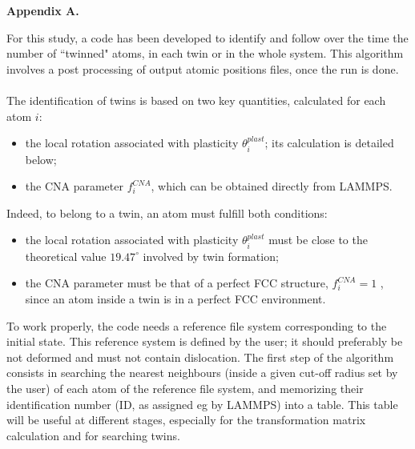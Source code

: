 \documentclass[final,3p,times,twocolumn]{elsarticle}
\begin{document}
\appendix
\noindent\textbf{Appendix A.}\newline
\label{part_appendix}

\renewcommand\thefigure{A.\arabic{figure}} 
\setcounter{figure}{0} 
\renewcommand\theequation{A.\arabic{equation}}
\setcounter{equation}{0}

For this study, a code has been developed to identify and follow over the time the number of ``twinned" atoms, in each twin or in the whole system. This algorithm involves a post processing of output atomic positions files, once the run is done. 
\\
\\
The identification of twins is based on two key quantities, calculated for each atom $i$:
\begin{itemize}
\item the local rotation associated with plasticity $\theta_{i}^{plast}$; its calculation is detailed below;
\item the CNA parameter $ f^{CNA}_{i} $, which can be obtained directly from LAMMPS.
\end{itemize}
Indeed, to belong to a twin, an atom must fulfill both conditions:
\begin{itemize}
\item the local rotation associated with plasticity $\theta_{i}^{plast}$ must be close to the theoretical value $19.47^{\circ}$ involved by twin formation;
\item the CNA parameter must be that of a perfect FCC structure, $f^{CNA}_{i} = 1$ , since an atom inside a twin is in a perfect FCC environment.
\end{itemize}

To work properly, the code needs a reference file system corresponding to the initial state. This reference system is defined by the user; it should preferably be not deformed and must not contain dislocation. The first step of the algorithm consists in searching the nearest neighbours (inside a given cut-off radius set by the user) of each atom of the reference file system, and memorizing their identification number (ID, as assigned eg by LAMMPS) into a table. This table will be useful at different stages, especially for the transformation matrix calculation and for searching twins.
 
\end{document}
